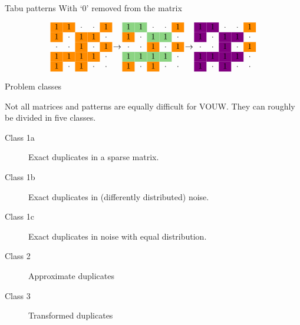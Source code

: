 \documentclass[11pt]{beamer}
\begin{document}
\begin{frame}{Tabu patterns}
With `0' removed from the matrix

\small
$$
\begin{matrix}
\ce 1 & \ce 1 & \cdot & \cdot & \ce 1  \\
\ce 1 & \cdot & \ce 1 & \ce 1 & \cdot  \\
\cdot & \cdot & \ce 1 & \cdot & \ce 1  \\
\ce 1 & \ce 1 & \ce 1 & \ce 1 & \cdot  \\
\ce 1 & \cdot & \ce 1 & \cdot & \cdot  \\
\end{matrix}
\ \rightarrow \
\begin{matrix}
\ca 1 & \ca 1 & \cdot & \cdot & \ce 1  \\
\ce 1 & \cdot & \ca 1 & \ca 1 & \cdot  \\
\cdot & \cdot & \ce 1 & \cdot & \ce 1  \\
\ca 1 & \ca 1 & \ca 1 & \ca 1 & \cdot  \\
\ce 1 & \cdot & \ce 1 & \cdot & \cdot  \\
\end{matrix}
\ \rightarrow \
\begin{matrix}
\cc 1 & \cc 1 & \cdot & \cdot & \ce 1  \\
\cc 1 & \cdot & \cc 1 & \cc 1 & \cdot  \\
\cdot & \cdot & \cc 1 & \cdot & \ce 1  \\
\cc 1 & \cc 1 & \cc 1 & \cc 1 & \cdot  \\
\cc 1 & \cdot & \cc 1 & \cdot & \cdot  \\
\end{matrix}
$$

\end{frame}


\begin{frame}{Problem classes}

Not all matrices and patterns are equally difficult for VOUW. They can roughly be divided in five classes.
\begin{description}
\item[Class 1a] Exact duplicates in a sparse matrix.
\item[Class 1b] Exact duplicates in (differently distributed) noise.
\item[Class 1c] Exact duplicates in noise with equal distribution.
\item[Class 2 ] Approximate duplicates
\item[Class 3 ] Transformed duplicates
\end{description}

\end{frame}
\end{document}
